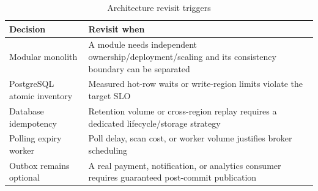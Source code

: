 \begin{table}[H]
\centering
\small
\caption{Architecture revisit triggers}
\begin{tabularx}{\textwidth}{p{}Y}
\toprule
\textbf{Decision} & \textbf{Revisit when} \\
\midrule
Modular monolith & A module needs independent ownership/deployment/scaling and its consistency boundary can be separated \\
PostgreSQL atomic inventory & Measured hot-row waits or write-region limits violate the target SLO \\
Database idempotency & Retention volume or cross-region replay requires a dedicated lifecycle/storage strategy \\
Polling expiry worker & Poll delay, scan cost, or worker volume justifies broker scheduling \\
Outbox remains optional & A real payment, notification, or analytics consumer requires guaranteed post-commit publication \\
\bottomrule
\end{tabularx}
\end{table}
